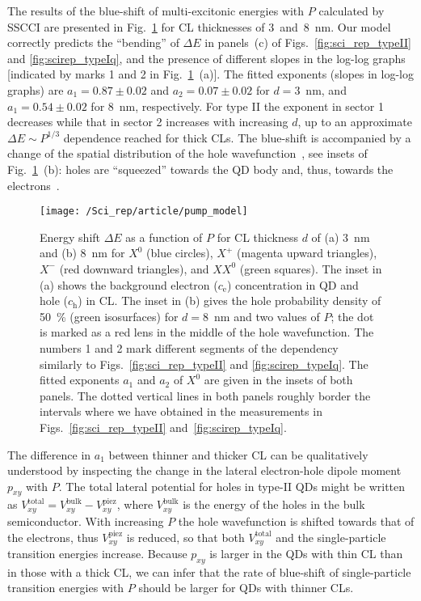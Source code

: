 The results of the blue-shift of multi-excitonic energies with $P$ calculated by SSCCI are presented in Fig.~\ref{fig:scirep_pumpmodel} for CL thicknesses of 3~and~8~nm. Our model correctly predicts the \enquote{bending} of $\Delta E$ in panels~(c) of Figs.~\ref{fig:sci_rep_typeII} and \ref{fig:scirep_typeIq}, and the presence of different slopes in the log-log graphs [indicated by marks 1 and 2 in Fig.~\ref{fig:scirep_pumpmodel}~(a)].  The fitted exponents (slopes in log-log graphs) are $a_1=0.87\pm0.02$ and $a_2=0.07\pm0.02$ for $d=$3~nm, and $a_1=0.54\pm0.02$ for 8~nm, respectively. For type II the exponent in sector 1 decreases while that in sector 2 increases with increasing $d$, up to an approximate $\Delta E\sim P^{1/3}$ dependence reached for thick CLs. The blue-shift is accompanied by a change of the spatial distribution of the hole wavefunction~\cite{Gradkowski2012}, see insets of Fig.~\ref{fig:scirep_pumpmodel}~(b): holes are \enquote{squeezed} towards the QD body and, thus, towards the electrons~\cite{Gradkowski2012,Llorens2015}. 
%
\begin{figure}
	\centering
	\texttt{[image: /Sci\_rep/article/pump\_model]}
	\caption{Energy shift $\Delta E$ as a function of $P$ for CL thickness $d$ of (a) 3~nm and (b) 8~nm for $X^0$ (blue circles), $X^+$ (magenta upward triangles), $X^-$ (red downward triangles), and $XX^0$ (green squares). The inset in (a) shows the background electron ($c_\mathrm{e}$) concentration in QD and hole ($c_\mathrm{h}$) in CL. The inset in (b) gives the hole probability density of 50~\% (green isosurfaces) for $d=8$~nm and two values of $P$; the dot is marked as a red lens in the middle of the hole wavefunction. The numbers 1 and 2 mark different segments of the dependency similarly to Figs.~\ref{fig:sci_rep_typeII} and \ref{fig:scirep_typeIq}. The fitted exponents $a_1$ and $a_2$ of $X^0$ are given in the insets of both panels. The dotted vertical lines in both panels roughly border the intervals where we have obtained in the measurements in Figs.~\ref{fig:sci_rep_typeII}  and~\ref{fig:scirep_typeIq}.}
	\label{fig:scirep_pumpmodel}
\end{figure}

The difference in $a_1$ between thinner and thicker CL can be qualitatively understood by inspecting the change in the lateral electron-hole dipole moment $p_{xy}$ with $P$. The total lateral potential for holes in type-II QDs might be written as $V_{xy}^\mathrm{total}=V_{xy}^\mathrm{bulk}-V^{\mathrm{piez}}_{xy}$, where $V^{\mathrm{bulk}}_{xy}$ is the energy of the holes in the bulk semiconductor. With increasing $P$ the hole wavefunction is shifted towards that of the electrons, thus $V^{\mathrm{piez}}_{xy}$ is reduced, so that both $V^{\mathrm{total}}_{xy}$ and the single-particle transition energies increase. Because $p_{xy}$ is larger in the QDs with thin CL than in those with a thick CL, we can infer that the rate of blue-shift of single-particle transition energies with $P$ should be larger for QDs with thinner CLs.

